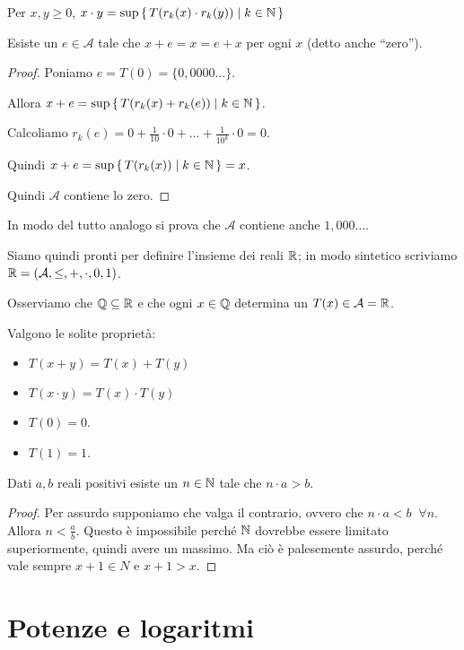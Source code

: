 Per $x, y \ge 0$, $x \cdot y = \sup \set{T(r_k(x) \cdot r_k(y)) | k \in \mathbb N}$

\begin{proposition}
Esiste un $e \in \mathcal{A}$ tale che $x + e = x = e + x$ per ogni $x$ (detto anche ``zero'').
\end{proposition}

\begin{proof}
Poniamo $e = T(0) = \{0,0000\dots\}$. 

Allora $x+e=\sup \set{T(r_k(x)+r_k(e)) | k \in \mathbb N}$.

Calcoliamo $r_k(e) = 0 + \frac{1}{10}\cdot 0 + \dots + \frac{1}{10^k}\cdot 0 = 0$.

Quindi $x + e = \sup \set{T(r_k(x)) | k \in \mathbb N} = x$.

Quindi $\mathcal{A}$ contiene lo zero.

\end{proof}

In modo del tutto analogo si prova che $\mathcal{A}$ contiene anche $1,000\dots$.

Siamo quindi pronti per definire l'insieme dei reali $\mathbb R$; in modo sintetico scriviamo $\mathbb R = (\mathcal{A}, \le, +, \cdot, 0, 1)$.

Osserviamo che $\mathbb Q \subseteq \mathbb R$ e che ogni $x \in \mathbb Q$ determina un $T(x) \in \mathcal{A} = \mathbb R$.

Valgono le solite proprietà:
\begin{itemize}
\item $T(x+y) = T(x) + T(y)$
\item $T(x \cdot y) = T(x) \cdot T(y)$
\item $T(0) = 0$.
\item $T(1) = 1$.
\end{itemize}

\begin{proposition}
Dati $a, b$ reali positivi esiste un $n \in \mathbb N$ tale che $n \cdot a > b$.
\end{proposition}

\begin{proof}
Per assurdo supponiamo che valga il contrario, ovvero che $n \cdot a < b \; \; \forall n$. Allora $n < \frac{a}{b}$. Questo è impossibile perché $\mathbb N$ dovrebbe essere limitato superiormente, quindi avere un massimo. Ma ciò è palesemente assurdo, perché vale sempre $x + 1 \in N$ e $x + 1 > x$.
\end{proof}

\section{Potenze e logaritmi}

